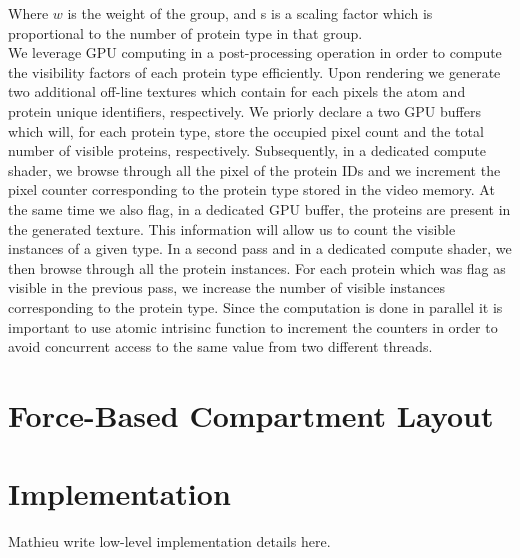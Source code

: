 \documentclass[review,journal]{vgtc}         %
\begin{document}
Where $w$ is the weight of the group, and s is a scaling factor which is proportional to the number of protein type in that group. \\

We leverage GPU computing in a post-processing operation in order to compute the visibility factors of each protein type efficiently.
Upon rendering we generate two additional off-line textures which contain for each pixels the atom and protein unique identifiers, respectively.
We priorly declare a two GPU buffers which will, for each protein type, store the occupied pixel count and the total number of visible proteins, respectively.
Subsequently, in a dedicated compute shader, we browse through all the pixel of the protein IDs and we increment the pixel counter corresponding to the protein type stored in the video memory.
At the same time we also flag, in a dedicated GPU buffer, the proteins are present in the generated texture.
This information will allow us to count the visible instances of a given type.
In a second pass and in a dedicated compute shader, we then browse through all the protein instances.
For each protein which was flag as visible in the previous pass, we increase the number of visible instances corresponding to the protein type.
Since the computation is done in parallel it is important to use atomic intrisinc function to increment the counters in order to avoid concurrent access to the same value from two different threads.


\section{Force-Based Compartment Layout}


\section{Implementation}

Mathieu write low-level implementation details here.

%
%
%
%
%
%
\end{document}
